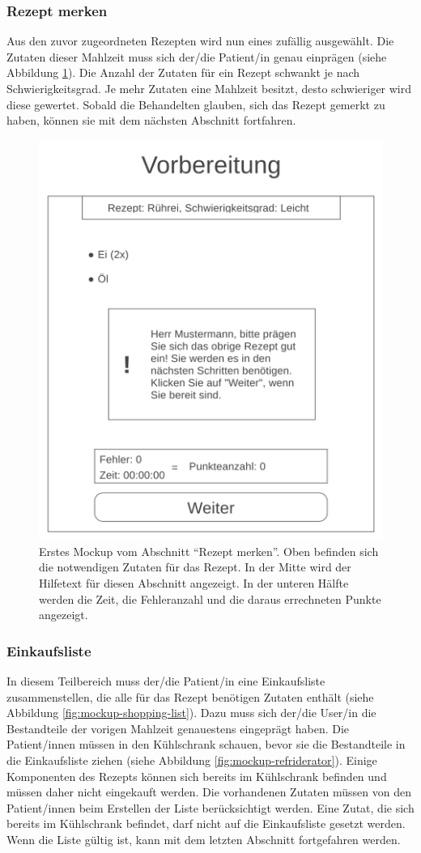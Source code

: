 \subsubsection{Rezept merken}
Aus den zuvor zugeordneten Rezepten wird nun eines zufällig ausgewählt. Die Zutaten dieser Mahlzeit muss sich der/die Patient/in genau einprägen (siehe Abbildung \ref{fig:mockup-remember-recipe}). Die Anzahl der Zutaten für ein Rezept schwankt je nach Schwierigkeitsgrad. Je mehr Zutaten eine Mahlzeit besitzt, desto schwieriger wird diese gewertet. Sobald die Behandelten glauben, sich das Rezept gemerkt zu haben, können sie mit dem nächsten Abschnitt fortfahren.

\begin{figure}[H]
    \centering
	\includegraphics[width=0.6\linewidth]{figures/development/mockup/remember-recipe.png}
	\caption{Erstes Mockup vom Abschnitt \enquote{Rezept merken}. Oben befinden sich die notwendigen Zutaten für das Rezept. In der Mitte wird der Hilfetext für diesen Abschnitt angezeigt. In der unteren Hälfte werden die Zeit, die Fehleranzahl und die daraus errechneten Punkte angezeigt.}
	\label{fig:mockup-remember-recipe}
\end{figure}

\subsubsection{Einkaufsliste}
In diesem Teilbereich muss der/die Patient/in eine Einkaufsliste zusammenstellen, die alle für das Rezept benötigen Zutaten enthält (siehe Abbildung \ref{fig:mockup-shopping-list}). Dazu muss sich der/die User/in die Bestandteile der vorigen Mahlzeit genauestens eingeprägt haben. Die Patient/innen müssen in den Kühlschrank schauen, bevor sie die Bestandteile in die Einkaufsliste ziehen (siehe Abbildung \ref{fig:mockup-refriderator}). Einige Komponenten des Rezepts können sich bereits im Kühlschrank befinden und müssen daher nicht eingekauft werden. Die vorhandenen Zutaten müssen von den Patient/innen beim Erstellen der Liste berücksichtigt werden. Eine Zutat, die sich bereits im Kühlschrank befindet, darf nicht auf die Einkaufsliste gesetzt werden. Wenn die Liste gültig ist, kann mit dem letzten Abschnitt fortgefahren werden.

